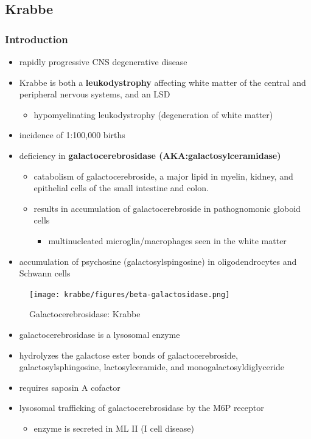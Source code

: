 \documentclass[12pt]{scrartcl}
\begin{document}
\subsection{Krabbe}
\label{sec:orge74cbd9}
\subsubsection{Introduction}
\label{sec:org668c107}
\begin{itemize}
\item rapidly progressive CNS degenerative disease
\item Krabbe is both a \textbf{leukodystrophy} affecting white matter of the central
and peripheral nervous systems, and an LSD
\begin{itemize}
\item hypomyelinating leukodystrophy (degeneration of white matter)
\end{itemize}
\item incidence of 1:100,000 births
\item deficiency in \textbf{galactocerebrosidase (AKA:galactosylceramidase)} 
\begin{itemize}
\item catabolism of galactocerebroside, a major lipid in myelin, kidney, and epithelial cells of the small intestine and colon.
\item results in accumulation of galactocerebroside in pathognomonic globoid cells
\begin{itemize}
\item multinucleated microglia/macrophages seen in the white matter
\end{itemize}
\end{itemize}
\item accumulation of psychosine (galactosylspingosine) in oligodendrocytes and Schwann cells
\end{itemize}

\begin{figure}[htbp]
\centering
\texttt{[image: krabbe/figures/beta-galactosidase.png]}
\caption{\label{fig:orgca41e56}Galactocerebrosidase: Krabbe}
\end{figure}

\begin{itemize}
\item galactocerebrosidase is a lysosomal enzyme
\item hydrolyzes the galactose ester bonds of galactocerebroside, galactosylsphingosine, lactosylceramide, and monogalactosyldiglyceride
\item requires saposin A cofactor
\item lysosomal trafficking of galactocerebrosidase by the M6P receptor
\begin{itemize}
\item enzyme is secreted in ML II (I cell disease)
\end{itemize}
\end{itemize}
\end{document}
